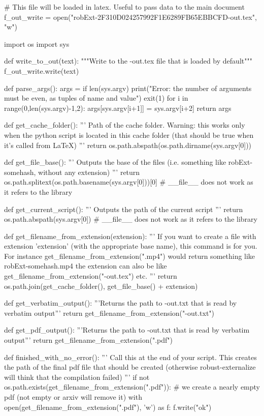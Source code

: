 
# This file will be loaded in latex. Useful to pass data to the main document
f_out_write = open("robExt-2F310D024257992F1E6289FB65EBBCFD-out.tex", "w")

import os
import sys

def write_to_out(text):
    """Write to the -out.tex file that is loaded by default"""
    f_out_write.write(text)

def parse_args():
    args = {}
    if len(sys.argv) %
        print("Error: the number of arguments must be even, as tuples of name and value")
        exit(1)
    for i in range(0,len(sys.argv)-1,2):
        args[sys.argv[i+1]] = sys.argv[i+2]
    return args

def get_cache_folder():
    '''
    Path of the cache folder. Warning: this works only when the python script
    is located in this cache folder (that should be true when it's called from LaTeX)
    '''
    return os.path.abspath(os.path.dirname(sys.argv[0]))

def get_file_base():
    '''
    Outputs the base of the files (i.e. something like robExt-somehash, without any extension)
    '''
    return os.path.splitext(os.path.basename(sys.argv[0]))[0] # __file__ does not work as it refers to the library

def get_current_script():
    '''
    Outputs the path of the current script
    '''
    return os.path.abspath(sys.argv[0]) # __file__ does not work as it refers to the library


def get_filename_from_extension(extension):
    '''
    If you want to create a file with extension 'extension' (with the appropriate base name), this command
    is for you. For instance get_filename_from_extension(".mp4") would return something like
    robExt-somehash.mp4
    the extension can also be like get_filename_from_extension("-out.tex") etc.
    '''
    return os.path.join(get_cache_folder(), get_file_base() + extension)

def get_verbatim_output():
    '''Returns the path to -out.txt that is read by verbatim output'''
    return get_filename_from_extension("-out.txt")

def get_pdf_output():
    '''Returns the path to -out.txt that is read by verbatim output'''
    return get_filename_from_extension(".pdf")


def finished_with_no_error():
    '''
    Call this at the end of your script. This creates the path of the final pdf file that should be
    created (otherwise robust-externalize will think that the compilation failed)
    '''
    if not os.path.exists(get_filename_from_extension(".pdf")):
        # we create a nearly empty pdf (not empty or arxiv will remove it)
        with open(get_filename_from_extension(".pdf"), 'w') as f:
            f.write("ok")

